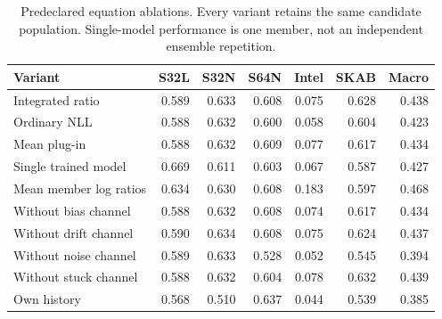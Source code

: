 \begin{table}[t]
\centering
\caption{Predeclared equation ablations. Every variant retains the same candidate population. Single-model performance is one member, not an independent ensemble repetition.}
\label{tab:ablations}
\small
\begin{tabular}{lrrrrrr}
\toprule
Variant & S32L & S32N & S64N & Intel & SKAB & Macro \\
\midrule
Integrated ratio & 0.589 & 0.633 & 0.608 & 0.075 & 0.628 & 0.438 \\
Ordinary NLL & 0.588 & 0.632 & 0.600 & 0.058 & 0.604 & 0.423 \\
Mean plug-in & 0.588 & 0.632 & 0.609 & 0.077 & 0.617 & 0.434 \\
Single trained model & 0.669 & 0.611 & 0.603 & 0.067 & 0.587 & 0.427 \\
Mean member log ratios & 0.634 & 0.630 & 0.608 & 0.183 & 0.597 & 0.468 \\
Without bias channel & 0.588 & 0.632 & 0.608 & 0.074 & 0.617 & 0.434 \\
Without drift channel & 0.590 & 0.634 & 0.608 & 0.075 & 0.624 & 0.437 \\
Without noise channel & 0.589 & 0.633 & 0.528 & 0.052 & 0.545 & 0.394 \\
Without stuck channel & 0.588 & 0.632 & 0.604 & 0.078 & 0.632 & 0.439 \\
Own history & 0.568 & 0.510 & 0.637 & 0.044 & 0.539 & 0.385 \\
\bottomrule
\end{tabular}
\end{table}
